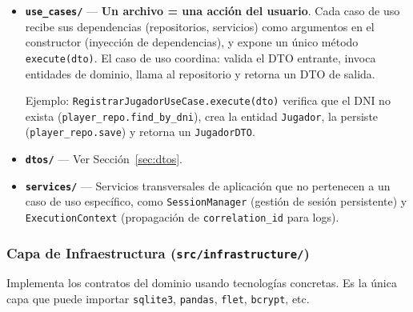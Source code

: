 \documentclass[11pt,a4paper]{article}
\newcommand{\fpath}[1]{\texttt{\small #1}}
\begin{document}
\begin{itemize}
  \item \textbf{\fpath{use\_cases/}} — \textbf{Un archivo = una acción del usuario}. Cada caso de uso recibe sus dependencias (repositorios, servicios) como argumentos en el constructor (inyección de dependencias), y expone un único método \fpath{execute(dto)}. El caso de uso coordina: valida el DTO entrante, invoca entidades de dominio, llama al repositorio y retorna un DTO de salida.

  Ejemplo: \fpath{RegistrarJugadorUseCase.execute(dto)} verifica que el DNI no exista (\fpath{player\_repo.find\_by\_dni}), crea la entidad \fpath{Jugador}, la persiste (\fpath{player\_repo.save}) y retorna un \fpath{JugadorDTO}.

  \item \textbf{\fpath{dtos/}} — Ver Sección~\ref{sec:dtos}.

  \item \textbf{\fpath{services/}} — Servicios transversales de aplicación que no pertenecen a un caso de uso específico, como \fpath{SessionManager} (gestión de sesión persistente) y \fpath{ExecutionContext} (propagación de \fpath{correlation\_id} para logs).
\end{itemize}

\subsubsection{Capa de Infraestructura (\texttt{src/infrastructure/})}

Implementa los contratos del dominio usando tecnologías concretas. Es la única capa que puede importar \fpath{sqlite3}, \fpath{pandas}, \fpath{flet}, \fpath{bcrypt}, etc.
\end{document}
